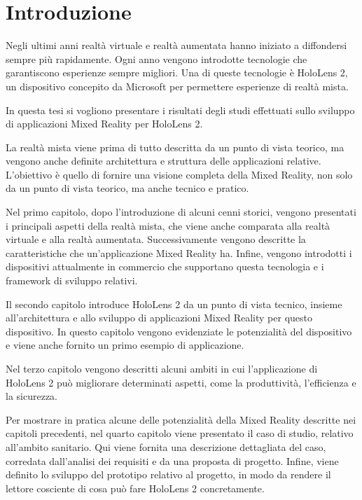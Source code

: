 \chapter{Introduzione}
Negli ultimi anni realtà virtuale e realtà aumentata hanno iniziato a diffondersi sempre più rapidamente.
Ogni anno vengono introdotte tecnologie che garantiscono esperienze sempre migliori.
Una di queste tecnologie è HoloLens 2, un dispositivo concepito da Microsoft per permettere esperienze di realtà mista.

In questa tesi si vogliono presentare i risultati degli studi effettuati sullo sviluppo di applicazioni Mixed Reality per HoloLens 2.

La realtà mista viene prima di tutto descritta da un punto di vista teorico, ma vengono anche definite architettura e struttura delle applicazioni relative.
L'obiettivo è quello di fornire una visione completa della Mixed Reality, non solo da un punto di vista teorico, ma anche tecnico e pratico.

Nel primo capitolo, dopo l'introduzione di alcuni cenni storici, vengono presentati i principali aspetti della realtà mista, che viene anche comparata alla realtà virtuale e alla realtà aumentata.
Successivamente vengono descritte la caratteristiche che un'applicazione Mixed Reality ha.
Infine, vengono introdotti i dispositivi attualmente in commercio che supportano questa tecnologia e i framework di sviluppo relativi.

Il secondo capitolo introduce HoloLens 2 da un punto di vista tecnico, insieme all'architettura e allo sviluppo di applicazioni Mixed Reality per questo dispositivo.
In questo capitolo vengono evidenziate le potenzialità del dispositivo e viene anche fornito un primo esempio di applicazione.

Nel terzo capitolo vengono descritti alcuni ambiti in cui l'applicazione di HoloLens 2 può migliorare determinati aspetti, come la produttività, l'efficienza e la sicurezza.

Per mostrare in pratica alcune delle potenzialità della Mixed Reality descritte nei capitoli precedenti, nel quarto capitolo viene presentato il caso di studio, relativo all'ambito sanitario. Qui viene fornita una descrizione dettagliata del caso, corredata dall'analisi dei requisiti e da una proposta di progetto.
Infine, viene definito lo sviluppo del prototipo relativo al progetto, in modo da rendere il lettore cosciente di cosa può fare HoloLens 2 concretamente. 
